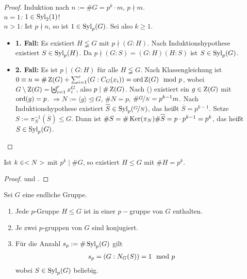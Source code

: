 \begin{proof}
	Induktion nach $n:=\#G=p^k\cdot m$, $p\nmid m$. \\
	\emph{$n=1$:} $1 \in \operatorname{Syl}_2(1)$! \\
	\emph{$n>1$:} Ist $p\nmid n$, so ist $1 \in \operatorname{Syl}_p(G)$. Sei also $k \geq 1$.
	\begin{itemize}
		\item \textbf{1. Fall:} Es existiert $H \lneqq G$ mit $p \nmid (G:H)$. Nach Induktionshypothese existiert $S \in \operatorname{Syl}_p(H)$. Da $p \nmid (G:S)=(G:H)(H:S)$ ist $S \in \operatorname{Syl}_p(G)$.
		\item \textbf{2. Fall:} Es ist $p \mid (G:H)$ für alle $H \lneqq G$. Nach Klassengleichung  ist $0 \equiv n = \#\operatorname{Z}(G) + \sum_{i=1}^{r} (G:C_G(x_i)) = \operatorname{ord}{\operatorname{Z}(G)} \mod p$, wobei $G \setminus \operatorname{Z}(G) = \biguplus_{i=1}^{r}x_i^G$, also $p \mid \#\operatorname{Z}(G)$. Nach  () existiert ein $g \in \operatorname{Z}(G)$ mit $\operatorname{ord}(g) = p$. $\Rightarrow N:=\langle g \rangle \unlhd G$, $\#N = p$, $\# \nicefrac{G}{N} = p^{k-1}m$. Nach Induktionshypothese existiert $\overline{S}\in \Syl_p(\lnkset{G}{N})$, das heißt $\overline{S} = p^{k-1}$. Setze $S:= \pi_N^{-1}(\overline{S}) \leq G$. Dann ist $\#S = \#\Ker(\pi_N)\#\overline{S}=p\cdot p^{k-1} = p^k$, das heißt $S \in \operatorname{Syl}_p(G)$.
	\end{itemize}
\end{proof}

\begin{conclusion}
	Ist $k \in <N>$ mit $p^k \mid \#G$, so existiert $H \leq G$ mit $\#H = p^k$.
\end{conclusion}
\begin{proof}
	 und .
\end{proof}

\begin{theorem}
	Sei $G$ eine endliche Gruppe.
	\begin{enumerate}[label=(\alph*)]
		\item Jede $p$-Gruppe $H \leq G$ ist in einer $p-$gruppe von $G$ enthalten.
		\item Je zwei $p$-gruppen von $G$ sind konjugiert.
		\item Für die Anzahl $s_p := \#\operatorname{Syl}_p(G)$ gilt 
		\begin{align}
			s_p = (G:N_G(S)) = 1 \mod p\notag
		\end{align}
		wobei $S \in \operatorname{Syl}_p(G)$ beliebig.
	\end{enumerate}
\end{theorem}

